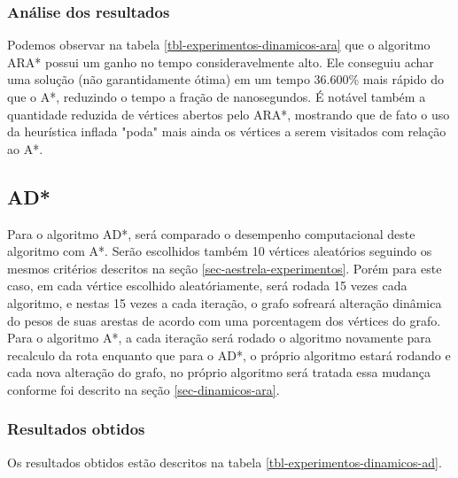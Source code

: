 \subsubsection{Análise dos resultados}
\label{sec-experimentos-dinamicos-ara-analise}

Podemos observar na tabela \ref{tbl-experimentos-dinamicos-ara} que o algoritmo ARA* possui um ganho no tempo consideravelmente alto. Ele conseguiu achar uma solução (não garantidamente ótima) em um tempo 36.600\% mais rápido do que o A*, reduzindo o tempo a fração de nanosegundos. É notável também a quantidade reduzida de vértices abertos pelo ARA*, mostrando que de fato o uso da heurística inflada "poda" mais ainda os vértices a serem visitados com relação ao A*.

\subsection{AD*}
\label{sec-experimentos-dinamicos-ad}

Para o algoritmo AD*, será comparado o desempenho computacional deste algoritmo com A*. Serão escolhidos também 10 vértices aleatórios seguindo os mesmos critérios descritos na seção \ref{sec-aestrela-experimentos}. Porém para este caso, em cada vértice escolhido aleatóriamente, será rodada 15 vezes cada algoritmo, e nestas 15 vezes a cada iteração, o grafo sofreará alteração dinâmica do pesos de suas arestas de acordo com uma porcentagem dos vértices do grafo. Para o algoritmo A*, a cada iteração será rodado o algoritmo novamente para recalculo da rota enquanto que para o AD*, o próprio algoritmo estará rodando e cada nova alteração do grafo, no próprio algoritmo será tratada essa mudança conforme foi descrito na seção \ref{sec-dinamicos-ara}.

\subsubsection{Resultados obtidos}
\label{sec-experimentos-dinamicos-ad-resultados}

Os resultados obtidos estão descritos na tabela \ref{tbl-experimentos-dinamicos-ad}.

